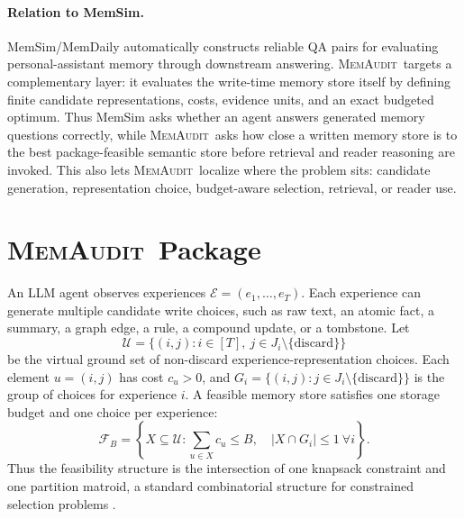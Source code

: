 \documentclass{article}
\theoremstyle{remark}
\theoremstyle{plain}
\newcommand{\method}{\textsc{MemAudit}}
\newcommand{\budget}{B}
\newcommand{\experiences}{\mathcal{E}}
\newcommand{\ground}{\mathcal{U}}
\newcommand{\feasible}{\mathcal{F}}
\begin{document}
\paragraph{Relation to MemSim.}
MemSim/MemDaily \cite{zhang2024memsim} automatically constructs reliable QA pairs for evaluating personal-assistant memory through downstream answering. \method\ targets a complementary layer: it evaluates the write-time memory store itself by defining finite candidate representations, costs, evidence units, and an exact budgeted optimum. Thus MemSim asks whether an agent answers generated memory questions correctly, while \method\ asks how close a written memory store is to the best package-feasible semantic store before retrieval and reader reasoning are invoked. This also lets \method\ localize where the problem sits: candidate generation, representation choice, budget-aware selection, retrieval, or reader use.

\section{\method\ Package}\label{sec:package}

An LLM agent observes experiences $\experiences=(e_1,\ldots,e_T)$. Each experience can generate multiple candidate write choices, such as raw text, an atomic fact, a summary, a graph edge, a rule, a compound update, or a tombstone. Let
\[
\ground=\{(i,j): i\in[T],\ j\in J_i\setminus\{\mathrm{discard}\}\}
\]
be the virtual ground set of non-discard experience-representation choices. Each element $u=(i,j)$ has cost $c_u>0$, and $G_i=\{(i,j):j\in J_i\setminus\{\mathrm{discard}\}\}$ is the group of choices for experience $i$. A feasible memory store satisfies one storage budget and one choice per experience:
\begin{equation}
\feasible_\budget=
\left\{X\subseteq\ground:
\sum_{u\in X}c_u\leq\budget,\quad |X\cap G_i|\leq1\ \forall i
\right\}.
\label{eq:feasible}
\end{equation}
Thus the feasibility structure is the intersection of one knapsack constraint and one partition matroid, a standard combinatorial structure for constrained selection problems \cite{nemhauser1978,sviridenko2004}.
\end{document}
